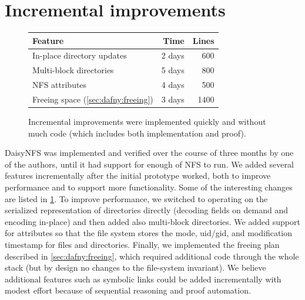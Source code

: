 
\section{Incremental improvements}
\label{sec:eval:incremental}

\begin{figure}
\begin{tabular}{lrr}
  \toprule
  \textbf{Feature} & \textbf{Time} & \textbf{Lines} \\
  \midrule
  In-place directory updates & 2 days & 600\\
  Multi-block directories & 5 days & 800 \\
  NFS attributes & 4 days & 500 \\
  Freeing space (\cref{sec:dafny:freeing}) & 3 days & 1400\\
  \bottomrule
\end{tabular}
\caption{Incremental improvements were implemented quickly and without much
  code (which includes both implementation and proof).}
\label{fig:features}
\end{figure}

DaisyNFS was implemented and verified over the course of three months by
one of the authors, until it had support for enough of NFS to run. We
added several features incrementally after the initial prototype
worked, both to improve performance and to support more
functionality. Some of the interesting changes are listed in
\cref{fig:features}.  To improve performance, we switched to
operating on the serialized representation of directories directly
(decoding fields on demand and encoding in-place) and then added also
multi-block directories.  We added support for attributes so that the file
system stores the mode, uid/gid, and modification timestamp for files and directories.
Finally, we implemented the freeing plan described
in \cref{sec:dafny:freeing}, which required additional code through the
whole stack (but by design no changes to the file-system invariant).
We believe additional features such as symbolic links
could be added incrementally with modest effort because
of sequential reasoning and proof automation.

